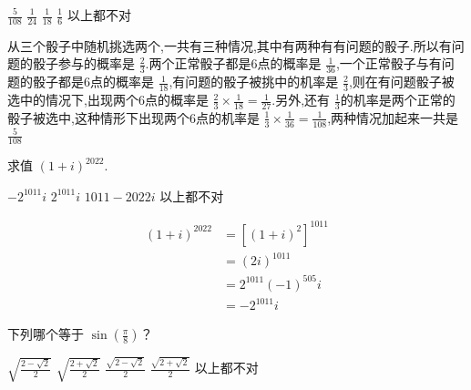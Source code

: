 \documentclass[answers]{exam}
\begin{document}
\begin{questions}
	\begin{oneparchoices}
		\CorrectChoice \( \frac{5}{108} \)
		\choice \( \frac{1}{24} \)
		\choice \( \frac{1}{18} \)
		\choice \( \frac{1}{6} \)
		\choice 以上都不对
	\end{oneparchoices}

	\begin{solution}
		从三个骰子中随机挑选两个,一共有三种情况,其中有两种有有问题的骰子.所以有问题的骰子参与的概率是 \( \frac{2}{3} \).两个正常骰子都是6点的概率是 \( \frac{1}{36}
		\),一个正常骰子与有问题的骰子都是6点的概率是 \( \frac{1}{18} \),有问题的骰子被挑中的机率是 \( \frac{2}{3}
		\),则在有问题骰子被选中的情况下,出现两个6点的概率是 \( \frac{2}{3} \times \frac{1}{18} = \frac{1}{27} \).另外,还有 \(
		\frac{1}{3} \)的机率是两个正常的骰子被选中,这种情形下出现两个6点的机率是 \( \frac{1}{3} \times \frac{1}{36} =
		\frac{1}{108} \),两种情况加起来一共是 \( \frac{5}{108} \)
	\end{solution}

	\question 求值 \( (1+i)^{2022} \).

	\begin{oneparchoices}
		\choice 1
		\CorrectChoice \( -2^{1011}i \)
		\choice \( 2^{1011}i \)
		\choice \( 1011 - 2022i \)
		\choice 以上都不对
	\end{oneparchoices}

	\begin{solution}
		\begin{align*}
			(1 + i) ^ {2022} & = [(1+i)^2]^{1011}    \\
			                 & = (2i)^{1011}         \\
			                 & = 2^{1011}(-1)^{505}i \\
			                 & = -2^{1011}i
		\end{align*}
	\end{solution}

	\question 下列哪个等于 \(\displaystyle \sin\left(\frac{\pi}{8}\right) \)？

	\begin{oneparchoices}
		\choice \(\displaystyle \sqrt{\frac{2-\sqrt{2}}{2}} \)
		\choice \(\displaystyle \sqrt{\frac{2+\sqrt{2}}{2}} \)
		\CorrectChoice \(\displaystyle \frac{\sqrt{2-\sqrt{2}}}{2} \)
		\choice \(\displaystyle \frac{\sqrt{2+\sqrt{2}}}{2} \)
		\choice 以上都不对
	\end{oneparchoices}


\end{questions}
\end{document}
